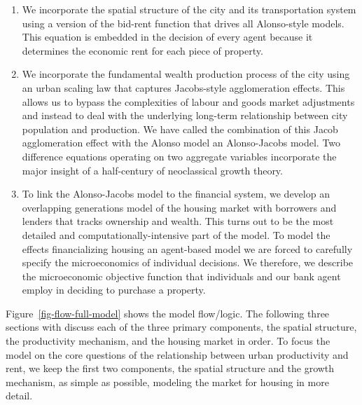 \begin{enumerate}
\item We incorporate the spatial structure of the city and its transportation system using a version of the \gls{bid-rent function} that drives all Alonso-style models. This equation is embedded in the decision of every agent because it determines the economic rent for each piece of property.

\item We incorporate the fundamental wealth production process of the city using an \gls{urban scaling} law that captures Jacobs-style agglomeration effects. This allows us to bypass the complexities of labour and goods market adjustments and instead to deal with the underlying long-term relationship between city population and production. We have called the combination of this Jacob agglomeration effect with the Alonso model an \gls{Alonso-Jacobs model}. Two difference equations operating on two aggregate variables incorporate the major insight of a half-century of \gls{neoclassical growth theory}.

\item To link the Alonso-Jacobs model to the financial system, we develop an \gls{overlapping generations} model of the housing market with borrowers and lenders that tracks ownership and wealth. This turns out to be the most detailed and computationally-intensive part of the model. To model the effects financializing housing an \gls{agent-based model} we are forced to carefully specify the microeconomics of individual decisions. %
We therefore, we describe the microeconomic objective function that individuals and our bank agent employ in deciding to purchase a property. 
\end{enumerate}

Figure~\ref{fig-flow-full-model} shows the model flow/logic.  The following three sections with discuss each of the three primary components, the spatial structure, the productivity mechanism, and the housing market in order.  To focus the model on the core questions of the relationship between urban productivity and rent, we keep the first two components,  the spatial structure and the growth mechanism,  as simple as possible, modeling the market for housing in more detail. 


